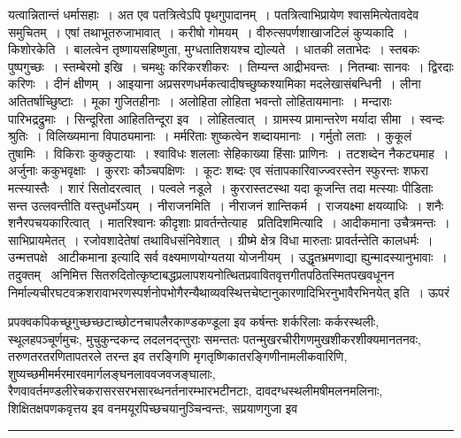 \documentclass[11pt, openany]{book}
\begin{document}
\noindent
{\s यत्वान्नितान्तं धर्मासहाः~। अत एव पतत्रित्वेऽपि पृथगुपादानम्~। पतत्रित्वाभिप्रायेण श्वासमित्येतावदेव समुचितम्~। एषां तथाभूतरुजाभावात्~। करीषो गोमयम्~। वीरुत्सपर्णशाखाजटिलं कुप्यकादि~। {\qtt किशोरकेति}~। बालत्वेन तृष्णायसहिष्णुता, मुग्धतातिशयश्च द्योल्यते~। धातकी लताभेदः~। स्तबकः पुष्पगुच्छः~। स्तम्बेरमो इखि~। चमथुः करिकरशीकरः~। तिम्यन्त आद्रीभवन्तः~। नितम्बाः सानवः~। द्विरदाः करिणः~। दीनं क्षीणम्~। आइयाना अप्रसरणधर्मकत्वादीषच्छुष्कश्यामिका मदलेखासंबन्धिनी~। लीना अतितर्षाच्छुिष्टाः~। मूका गुजितहीनाः~। अलोहिता लोहिता भवन्तो लोहितायमानाः~। मन्दाराः पारिभद्रद्रुमाः~। सिन्दूरिता आहिततिन्दूरा इव~। लोहितत्वात्~। ग्रामस्य प्रामान्तरेण मर्यादा सीमा~। स्वन्दः श्रुतिः~। विलिख्यमाना विपाठ्यमानाः~। मर्मरिताः शुष्कत्वेन शब्दायमानाः~। गर्मुतो लताः~। कुकूलं तुषामिः~। विकिराः कुक्कुटायाः~। श्वाविधः शललाः सेहिकाख्या हिंसाः प्राणिनः~। तटशब्देन नैकट्यमाह~। अर्जुनाः ककुभवृक्षाः~। कुरराः कौञ्चपक्षिणः~। कूटः शब्दः एव संतापकारिवाज्ज्वरस्तेन स्फुरन्तः शफरा मत्स्यास्तैः~। शारं सितोदरत्वात्~। पल्वले नडूले~। कुररास्तटस्था यदा कूजन्ति तदा मत्स्याः पीडिताः सन्त उत्लवन्तीति वस्तुधर्मोऽयम्~। {\qtt नीराजनमिति}~। नीराजनं शान्तिकर्म~। राजयक्ष्मा क्षयव्याधिः~। शनैः शनैरपचयकारित्वात्~। मातरिश्वानः कीदृशाः प्रावर्तन्तेत्याह \textendash\ {\qtt प्रतिदिशमित्यादि}~। आदीकमाना उचैत्रमन्तः~। साभिप्रायमेतत्~। रजोवशादेतेषां तथाविधसंनिवेशात्~। ग्रीष्मे क्षेत्र विधा मारुताः प्रावर्तन्तेति कालधर्मः~। उन्मत्तपक्षे \textendash\ आटीकमाना इत्यादि सर्व वक्ष्यमाणयोग्यतया योजनीयम्~। उद्धृतभ्रमणाद्या ह्युन्मादस्यानुभावाः~। तदुक्तम् \textendash\ {\qt अनिमित्त सितरुदितोत्कृष्टाबद्धप्रलापशयनोत्थितप्रवावितवृत्तगीतपठितस्मितपखवधूनन निर्माल्यचीरघटवक्रशरावाभरणस्पर्शनोपभोगैरन्यैथाव्यवस्थित्तचेष्टानुकारणादिभिरनुभावैरभिनयेत्} इति~। ऊपरं}

\newpage

\noindent
प्रपक्वकपिकच्छूगुच्छच्छटाच्छोटनचापलैरकाण्डकण्डूला इव कर्षन्तः शर्करिलाः कर्करस्थलीः, स्थूलहपञ्चूर्णमुचः, मुचुकुन्दकन्द लदलनद्न्तुराः समन्ततः पतन्मुखरचीरीगणमुखशीकरशीक्यमानतनवः, तरुणतरतरणितापतरले तरन्त इव तरङ्गिणि मृगतृष्णिकातरङ्गिणीनामलीकवारिणि, शुष्यच्छमीमर्मरमारवमार्गलङ्घनलाववजवजङ्घालाः, रैणवावर्तमण्डलीरेचकरासरसरभसारब्धनर्तनारम्भारभटीनटाः, दावदग्धस्थलीमषीमलनमलिनाः, शिक्षितक्षपणकवृत्तय इव वनमयूरपिच्छचयानुञ्चिन्वन्तः, सप्रयाणगुजा इव

\vspace{2mm}
\hrule
\end{document}
